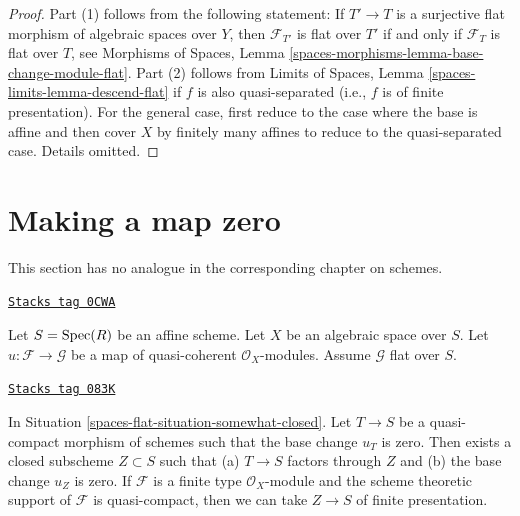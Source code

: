 \begin{proof}
Part (1) follows from the following statement: If $T' \to T$ is a surjective
flat morphism of algebraic spaces over $Y$, then
$\mathcal{F}_{T'}$ is flat over $T'$ if and only if
$\mathcal{F}_T$ is flat over $T$, see
Morphisms of Spaces, Lemma \ref{spaces-morphisms-lemma-base-change-module-flat}.
Part (2) follows from
Limits of Spaces, Lemma \ref{spaces-limits-lemma-descend-flat}
if $f$ is also quasi-separated (i.e., $f$ is of finite presentation).
For the general case, first reduce to the case where the
base is affine and then cover $X$ by finitely many affines
to reduce to the quasi-separated case. Details omitted.
\end{proof}

\section{Making a map zero}
\label{spaces-flat-section-zero-map}
This section has no analogue in the corresponding chapter on schemes.

\begin{definition}
\label{spaces-flat-situation-somewhat-closed}
\href{https://stacks.math.columbia.edu/tag/0CWA}{\texttt{Stacks tag 0CWA}}

Let $S = \operatorname{Spec}(R)$ be an affine scheme. Let $X$ be an algebraic space over
$S$. Let $u : \mathcal{F} \to \mathcal{G}$ be a map of quasi-coherent
$\mathcal{O}_X$-modules. Assume $\mathcal{G}$ flat over $S$.
\end{definition}

\begin{lemma}
\label{spaces-flat-lemma-F-zero-somewhat-closed}
\href{https://stacks.math.columbia.edu/tag/083K}{\texttt{Stacks tag 083K}}

In Situation \ref{spaces-flat-situation-somewhat-closed}. Let $T \to S$
be a quasi-compact morphism of schemes such that the base change $u_T$ is
zero. Then exists a closed subscheme $Z \subset S$ such that
(a) $T \to S$ factors through $Z$ and (b) the base change $u_Z$ is zero.
If $\mathcal{F}$ is a finite type $\mathcal{O}_X$-module and
the scheme theoretic support of $\mathcal{F}$ is quasi-compact,
then we can take $Z \to S$ of finite presentation.
\end{lemma}

